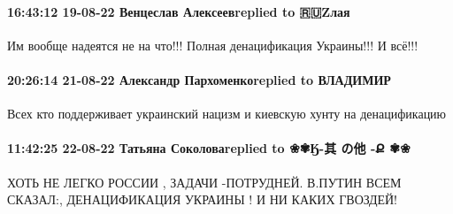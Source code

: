 \paragraph{16:43:12 19-08-22 Венцеслав Алексеевreplied to 🇷🇺Zлая}

Им вообще надеятся не на что!!! Полная денацификация Украины!!! И всё!!!

\paragraph{20:26:14 21-08-22 Александр Пархоменкоreplied to ВЛАДИМИР}

Всех кто поддерживает украинский нацизм и киевскую хунту на денацификацию

\paragraph{11:42:25 22-08-22 Татьяна Соколоваreplied to ❀✾Ӄ-其 の他 -Ք ✾❀}

ХОТЬ НЕ ЛЕГКО РОССИИ ,
ЗАДАЧИ -ПОТРУДНЕЙ.
В.ПУТИН ВСЕМ СКАЗАЛ:,
ДЕНАЦИФИКАЦИЯ УКРАИНЫ !
И НИ КАКИХ ГВОЗДЕЙ!

